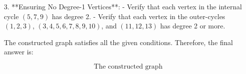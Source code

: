 3. **Ensuring No Degree-1 Vertices**:
   - Verify that each vertex in the internal cycle \((5,7,9)\) has degree 2.
   - Verify that each vertex in the outer-cycles \((1,2,3)\), \((3,4,5,6,7,8,9,10)\), and \((11,12,13)\) has degree 2 or more.

The constructed graph satisfies all the given conditions. Therefore, the final answer is:

\[
\boxed{\text{The constructed graph}}
\]
